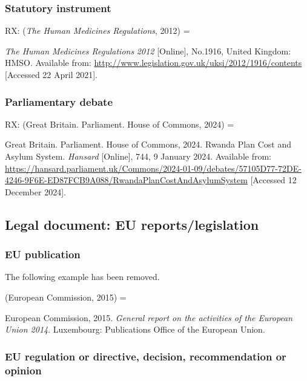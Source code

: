 \subsubsection*{Statutory instrument}

RX: (\emph{The Human Medicines Regulations}, 2012) = \cite{gb.hmr2012}

\emph{The Human Medicines Regulations} \emph{2012} [Online], No.1916, United Kingdom: HMSO. Available from: \url{http://www.legislation.gov.uk/uksi/2012/1916/contents} [Accessed 22 April 2021].




\subsubsection*{Parliamentary debate}

RX: (Great Britain. Parliament. House of Commons, 2024) = \cite{gb.hc2024rpc}

Great Britain. Parliament. House of Commons, 2024. Rwanda Plan Cost and Asylum System. \emph{Hansard} [Online], 744, 9 January 2024. Available from: \url{https://hansard.parliament.uk/Commons/2024-01-09/debates/57105D77-72DE-4246-9F6E-ED87FCB9A088/RwandaPlanCostAndAsylumSystem} [Accessed 12 December 2024].



\subsection{Legal document: EU reports\slash legislation}


\subsubsection*{EU publication}

The following example has been removed.

(European Commission, 2015) = \cite{ec2015gra}

European Commission, 2015. \emph{General report on the activities of the European Union 2014}. Luxembourg: Publications Office of the European Union.




\subsubsection*{EU regulation or directive, decision, recommendation or opinion}

